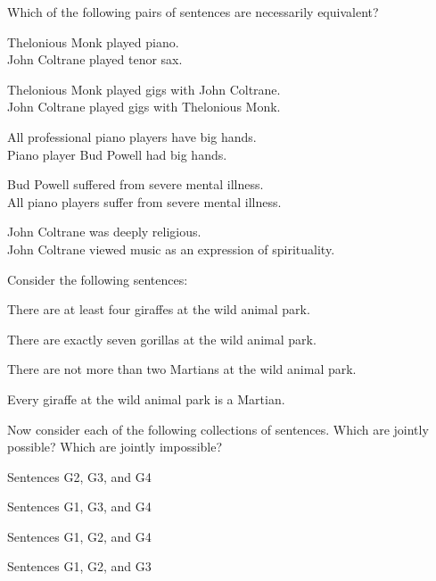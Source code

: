 \problempart Which of the following pairs of sentences are necessarily equivalent? 

\begin{compactlist}
\item  Thelonious Monk played piano.	\\
	John Coltrane played tenor sax.
\item  Thelonious Monk played gigs with John Coltrane.	\\
	John Coltrane played gigs with Thelonious Monk.
\item  All professional piano players have big hands.	\\
	Piano player Bud Powell had big hands.
\item  Bud Powell suffered from severe mental illness.	 \\
	All piano players suffer from severe mental illness.
\item John Coltrane was deeply religious.	 \\
John Coltrane viewed music as an expression of spirituality.
\end{compactlist}

\noindent
\problempart 
\label{pr.MartianGiraffes}
Consider the following sentences: 
\begin{compactlist}%
\item[G1.] \label{itm:at_least_four}There are at least four giraffes at the wild animal park.
\item[G2.] \label{itm:exactly_seven} There are exactly seven gorillas at the wild animal park.
\item[G3.] \label{itm:not_more_than_two} There are not more than two Martians at the wild animal park.
\item[G4.] \label{itm:martians} Every giraffe at the wild animal park is a Martian.
\end{compactlist}

Now consider each of the following collections of sentences. Which are jointly possible? Which are jointly impossible?
\begin{compactlist}
\item Sentences G2, G3, and G4
\hfill {}
\item Sentences G1, G3, and G4
\hfill {}
\item Sentences G1, G2, and G4
\hfill {}
\item Sentences G1, G2, and G3
\hfill {}
\end{compactlist}


